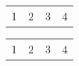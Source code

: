 \documentclass{article}
\begin{document}
	\begin{tabularx}{\linewidth}{llXX}
		1 & 2 & 3 & 4 \\
	\end{tabularx}

	\begin{tabularx}{\linewidth}[pos]{llXX}
		1 & 2 & 3 & 4 \\
	\end{tabularx}
\end{document}
